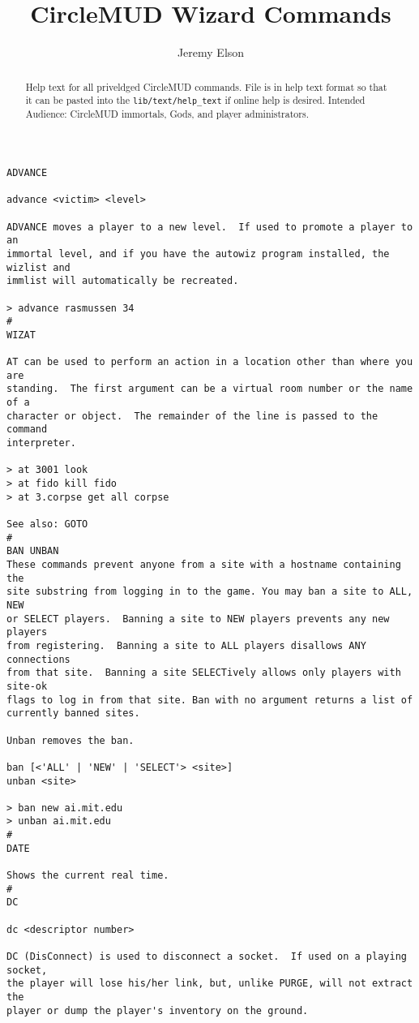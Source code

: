 \documentclass[11pt]{article}
\title{CircleMUD Wizard Commands}
\author{Jeremy Elson}
\begin{document}
\maketitle

\begin{abstract}
Help text for all priveldged CircleMUD commands.  File is in help text format so that it can be pasted into the \texttt{lib/text/help\_text} if online help is desired.\newline
Intended Audience: CircleMUD immortals, Gods, and player administrators.
\end{abstract}

\begin{verbatim}
ADVANCE

advance <victim> <level>

ADVANCE moves a player to a new level.  If used to promote a player to an
immortal level, and if you have the autowiz program installed, the wizlist and
immlist will automatically be recreated.

> advance rasmussen 34
#
WIZAT

AT can be used to perform an action in a location other than where you are
standing.  The first argument can be a virtual room number or the name of a
character or object.  The remainder of the line is passed to the command
interpreter.

> at 3001 look
> at fido kill fido
> at 3.corpse get all corpse

See also: GOTO
#
BAN UNBAN
These commands prevent anyone from a site with a hostname containing the
site substring from logging in to the game. You may ban a site to ALL, NEW
or SELECT players.  Banning a site to NEW players prevents any new players
from registering.  Banning a site to ALL players disallows ANY connections
from that site.  Banning a site SELECTively allows only players with site-ok
flags to log in from that site. Ban with no argument returns a list of
currently banned sites.

Unban removes the ban.

ban [<'ALL' | 'NEW' | 'SELECT'> <site>]
unban <site>

> ban new ai.mit.edu
> unban ai.mit.edu
#
DATE

Shows the current real time.
#
DC

dc <descriptor number>

DC (DisConnect) is used to disconnect a socket.  If used on a playing socket,
the player will lose his/her link, but, unlike PURGE, will not extract the
player or dump the player's inventory on the ground.


\end{verbatim}
\end{document}
